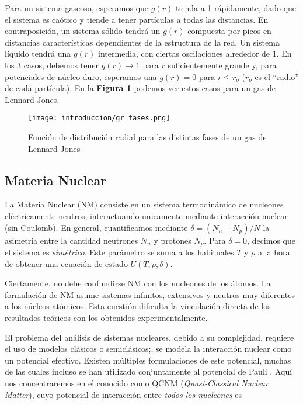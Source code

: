 Para un sistema gaseoso, esperamos que $g(r)$ tienda a 1 rápidamente, dado que el sistema es caótico y tiende a tener partículas a todas las distancias.
En contraposición, un sistema sólido tendrá un $g(r)$ compuesta por picos en distancias características dependientes de la estructura de la red.
Un sistema líquido tendrá una $g(r)$ intermedia, con ciertas oscilaciones alrededor de 1.
En los 3 casos, debemos tener $g(r)\to 1$ para $r$ suficientemente grande y, para potenciales de núcleo duro, esperamos una $g(r)=0$ para $r\leq r_o$ ($r_o$ es el ``radio'' de cada partícula).
En la \textbf{Figura \ref{fig:gr_fases}} podemos ver estos casos para un gas de Lennard-Jones.

\begin{figure}[H]
	\centering	%
	\texttt{[image: introduccion/gr\_fases.png]}
	\caption{Función de distribución radial para las distintas fases de un gas de Lennard-Jones}
	\label{fig:gr_fases}
\end{figure}

\subsection{Materia Nuclear}{\label{sec:intro_NM}}

La Materia Nuclear (NM) consiste en un sistema termodinámico de nucleones eléctricamente neutros, interactuando unicamente mediante interacción nuclear (sin Coulomb)\cite{Molinelli}.
En general, cuantificamos mediante $\delta=(N_n - N_p)/N$ la asimetría entre la cantidad neutrones $N_n$ y protones $N_p$.
Para $\delta=0$, decimos que el sistema es \textit{simétrico}.
Este parámetro se suma a los habituales $T$ y $\rho$ a la hora de obtener una ecuación de estado $U(T,\rho, \delta)$.

Ciertamente, no debe confundirse NM con los nucleones de los átomos.
La formulación de NM asume sistemas infinitos, extensivos y neutros muy diferentes a los núcleos atómicos.
Esta cuestión dificulta la vinculación directa de los resultados teóricos con los obtenidos experimentalmente.

El problema del análisis de sistemas nucleares, debido a su complejidad, requiere el uso de modelos clásicos o semiclásicos;, se modela la interacción nuclear como un potencial efectivo.
Existen múltiples formulaciones de este potencial, muchas de las cuales incluso se han utilizado conjuntamente al potencial de Pauli \cite{Maruyama2012,Perez-Garcia2008}.
Aquí nos concentraremos en el conocido como QCNM\cite{Dorso1988} (\textit{Quasi-Classical Nuclear Matter}), cuyo potencial de interacción entre \textit{todos los nucleones} es

